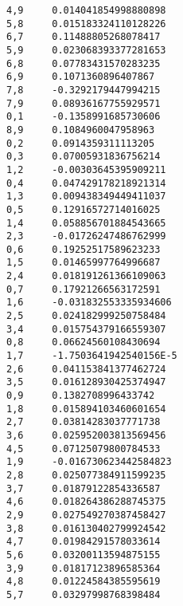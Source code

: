 \begin{lstlisting}
4,9     0.014041854998880898
5,8     0.015183324110128226
6,7     0.11488805268078417
5,9     0.023068393377281653
6,8     0.07783431570283235
6,9     0.1071360896407867
7,8     -0.3292179447994215
7,9     0.08936167755929571
0,1     -0.1358991685730606
8,9     0.1084960047958963
0,2     0.0914359311113205
0,3     0.07005931836756214
1,2     -0.00303645395909211
0,4     0.047429178218921314
1,3     0.009438349449411037
0,5     0.12916572714016025
1,4     0.058856701884543665
2,3     -0.01726247486762999
0,6     0.19252517589623233
1,5     0.01465997764996687
2,4     0.018191261366109063
0,7     0.17921266563172591
1,6     -0.031832553335934606
2,5     0.024182999250758484
3,4     0.015754379166559307
0,8     0.06624560108430694
1,7     -1.7503641942540156E-5
2,6     0.041153841377462724
3,5     0.016128930425374947
0,9     0.1382708996433742
1,8     0.015894103460601654
2,7     0.03814283037771738
3,6     0.025952003813569456
4,5     0.07125079800784533
1,9     -0.016730623442584823
2,8     0.025077384911599235
3,7     0.01879122854336587
4,6     0.018264386288745375
2,9     0.027549270387458427
3,8     0.016130402799924542
4,7     0.01984291578033614
5,6     0.03200113594875155
3,9     0.01817123896585364
4,8     0.01224584385595619
5,7     0.03297998768398484
\end{lstlisting}




